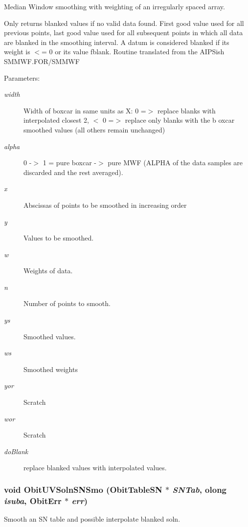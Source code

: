 Median Window smoothing with weighting of an irregularly spaced array. 

Only returns blanked values if no valid data found. First good value used for all previous points, last good value used for all subsequent points in which all data are blanked in the smoothing interval. A datum is considered blanked if its weight is $<$= 0 or its value fblank. Routine translated from the AIPSish SMMWF.FOR/SMMWF \begin{Desc}
\item[Parameters:]
\begin{description}
\item[{\em width}]Width of boxcar in same units as X: 0 =$>$ replace blanks with interpolated closest 2, $<$ 0 =$>$ replace only blanks with the b oxcar smoothed values (all others remain unchanged) \item[{\em alpha}]0 -$>$ 1 = pure boxcar -$>$ pure MWF (ALPHA of the data samples are discarded and the rest averaged). \item[{\em x}]Abscissas of points to be smoothed in increasing order \item[{\em y}]Values to be smoothed. \item[{\em w}]Weights of data. \item[{\em n}]Number of points to smooth. \item[{\em ys}]Smoothed values. \item[{\em ws}]Smoothed weights \item[{\em yor}]Scratch \item[{\em wor}]Scratch \item[{\em do\-Blank}]replace blanked values with interpolated values. \end{description}
\end{Desc}
\subsubsection{\setlength{\rightskip}{0pt plus 5cm}void Obit\-UVSoln\-SNSmo ({\bf Obit\-Table\-SN} $\ast$ {\em SNTab}, {\bf olong} {\em isuba}, {\bf Obit\-Err} $\ast$ {\em err})}\label{ObitUVSoln_8h_a28}


Smooth an SN table and possible interpolate blanked soln. 

